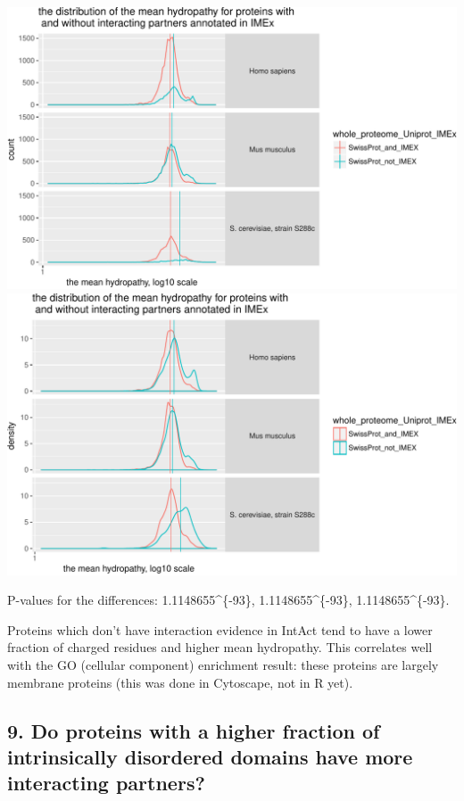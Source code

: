 \documentclass[]{article}
\begin{document}
\includegraphics{final_report_files/figure-latex/physical_properties_plot_Hydropathy_m-1.pdf}
\includegraphics{final_report_files/figure-latex/physical_properties_plot_Hydropathy_m-2.pdf}

P-values for the differences: 1.1148655\^{}\{-93\},
1.1148655\^{}\{-93\}, 1.1148655\^{}\{-93\}.

Proteins which don't have interaction evidence in IntAct tend to have a
lower fraction of charged residues and higher mean hydropathy. This
correlates well with the GO (cellular component) enrichment result:
these proteins are largely membrane proteins (this was done in
Cytoscape, not in R yet).

\subsection{9. Do proteins with a higher fraction of intrinsically
disordered domains have more interacting
partners?}\label{do-proteins-with-a-higher-fraction-of-intrinsically-disordered-domains-have-more-interacting-partners}
\end{document}
